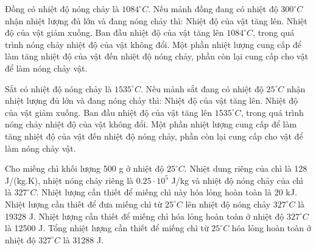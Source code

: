 \begin{ex}
Đồng có nhiệt độ nóng chảy là $1084^\circ C$. Nếu mảnh đồng đang có nhiệt độ $300^\circ C$ nhận nhiệt lượng đủ lớn và đang nóng chảy thì:
\choiceTF
{Nhiệt độ của vật tăng lên.}
{Nhiệt độ của vật giảm xuống.}
{\True Ban đầu nhiệt độ của vật tăng lên $1084^\circ C$, trong quá trình nóng chảy nhiệt độ của vật không đổi.}
{\True Một phần nhiệt lượng cung cấp để làm tăng nhiệt độ của vật đến nhiệt độ nóng chảy, phần còn lại cung cấp cho vật để làm nóng chảy vật.}
\end{ex}

\begin{ex}
Sắt có nhiệt độ nóng chảy là $1535^\circ C$. Nếu mảnh sắt đang có nhiệt độ $25^\circ C$ nhận nhiệt lượng đủ lớn và đang nóng chảy thì:
\choiceTF
{Nhiệt độ của vật tăng lên.}
{Nhiệt độ của vật giảm xuống.}
{\True Ban đầu nhiệt độ của vật tăng lên $1535^\circ C$, trong quá trình nóng chảy nhiệt độ của vật không đổi.}
{\True Một phần nhiệt lượng cung cấp để làm tăng nhiệt độ của vật đến nhiệt độ nóng chảy, phần còn lại cung cấp cho vật để làm nóng chảy vật.}
\end{ex}

\begin{ex}
Cho miếng chì khối lượng 500 g ở nhiệt độ $25^\circ C$. Nhiệt dung riêng của chì là 128 J/(kg.K), nhiệt nóng chảy riêng là $0.25 \cdot 10^5$ J/kg và nhiệt độ nóng chảy của chì là $327^\circ C$.
\choiceTF
{Nhiệt lượng cần thiết để miếng chì này hóa lỏng hoàn toàn là 20 kJ.}
{\True Nhiệt lượng cần thiết để đưa miếng chì từ $25^\circ C$ lên nhiệt độ nóng chảy $327^\circ C$ là 19328 J.}
{\True Nhiệt lượng cần thiết để miếng chì hóa lỏng hoàn toàn ở nhiệt độ $327^\circ C$ là 12500 J.}
{Tổng nhiệt lượng cần thiết để miếng chì từ $25^\circ C$ hóa lỏng hoàn toàn ở nhiệt độ $327^\circ C$ là 31288 J.}
\end{ex}


